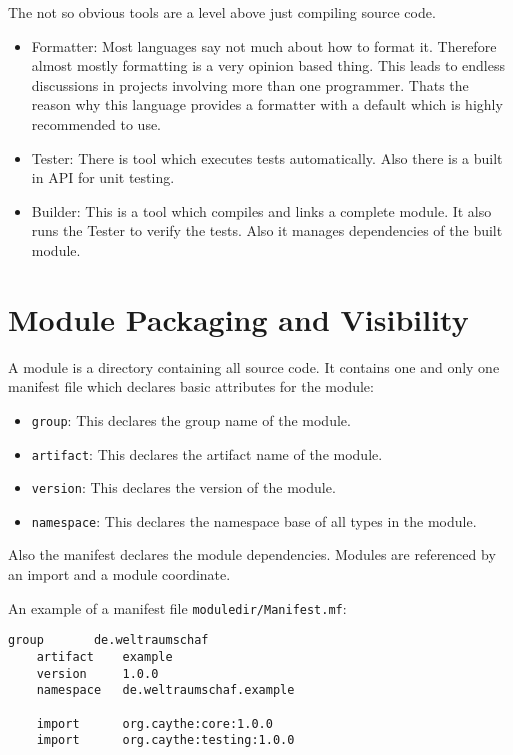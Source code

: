\documentclass[11pt,a4paper]{report}
\begin{document}
The not so obvious tools are a level above just compiling source code.

\begin{itemize}
    \item Formatter: Most languages say not much about how to format it. Therefore almost mostly formatting is a very opinion based thing. This leads to endless discussions in projects involving more than one programmer. Thats the reason why this language provides a formatter with a default which is highly recommended to use.
    \item Tester: There is tool which executes tests automatically. Also there is a built in API for unit testing.
    \item Builder: This is a tool which compiles and links a complete module. It also runs the Tester to verify the tests. Also it manages dependencies of the built module.
\end{itemize}

\section{Module Packaging and Visibility}

A module is a directory containing all source code. It contains one and only one manifest file which declares basic attributes for the module:

\begin{itemize}
    \item \texttt{group}: This declares the group name of the module.
    \item \texttt{artifact}: This declares the artifact name of the module.
    \item \texttt{version}: This declares the version of the module.
    \item \texttt{namespace}: This declares the namespace base of all types in the module.
\end{itemize}

Also the manifest declares the module dependencies. Modules are referenced by an import and a module coordinate.

An example of a manifest file \texttt{moduledir/Manifest.mf}:
\begin{lstlisting}[language=CayThe]
    group       de.weltraumschaf
    artifact    example
    version     1.0.0
    namespace   de.weltraumschaf.example

    import      org.caythe:core:1.0.0
    import      org.caythe:testing:1.0.0
\end{lstlisting}
\end{document}
